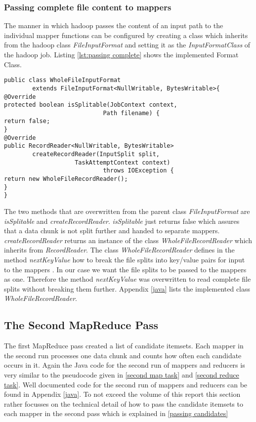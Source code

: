\subsubsection{Passing complete file content to mappers}\label{complete content}
The manner in which hadoop passes the content of an input path to the individual mapper functions can be configured by creating a class which inherits from the hadoop class \textit{FileInputFormat} and setting it as the \textit{InputFormatClass} of the hadoop job. Listing \ref{lst:passing complete} shows the implemented Format Class.
\begin{lstlisting}[caption={InputFormatClass to pass complete data chunk content to mappers},captionpos=b,label={lst:passing complete}]
public class WholeFileInputFormat 
		extends FileInputFormat<NullWritable, BytesWritable>{	
@Override
protected boolean isSplitable(JobContext context, 
							Path filename) {        
return false;
}
@Override
public RecordReader<NullWritable, BytesWritable>
		createRecordReader(InputSplit split, 
					TaskAttemptContext context)
 						 	throws IOException {   	
return new WholeFileRecordReader();       
}   
}
\end{lstlisting}
The two methods that are overwritten from the parent class \textit{FileInputFormat} are \textit{isSplitable} and \textit{createRecordReader}. \textit{isSplitable} just returns false which assures that a data chunk is not split further and handed to separate mappers. \textit{createRecordReader} returns an instance of the class \textit{WholeFileRecordReader} which inherits from \textit{RecordReader}. The class \textit{WholeFileRecordReader} defines in the method \textit{nextKeyValue} how to break the file splits into key/value pairs for input to the mappers . In our case we want the file splits to be passed to the mappers as one. Therefore the method \textit{nextKeyValue} was overwritten to read complete file splits without breaking them further. Appendix \ref{java} lists the implemented class \textit{WholeFileRecordReader}.
\subsection{The Second MapReduce Pass}\label{second pass details}

The first MapReduce pass created a list of candidate itemsets. Each mapper in the second run processes one data chunk and counts how often each candidate occurs in it. Again the Java code for the second run of mappers and reducers is very similar to the pseudocode given in \ref{second map task} and \ref{second reduce task}. Well documented code for the second run of mappers and reducers can be found in Appendix \ref{java}. To not exceed the volume of this report this section rather focusses on the technical detail of how to pass the candidate itemsets to each mapper in the second pass which is explained in \ref{passing candidates}
